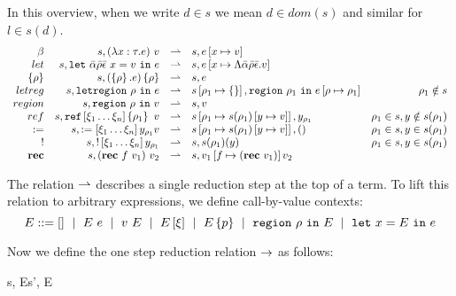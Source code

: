 \documentclass[a4paper]{article}
\newcommand{\rec}{{\bf rec}}
\newcommand{\void}{{\tt ()}}
\begin{document}
In this overview, when we write $d\in s$ we mean $d\in dom(s)$ and
similar for $l\in s(d)$.
\begin{equation*}
   \begin{array}[t]{rrclr}
    \beta & s, (\lambda x:\tau.e)\ v & \basered & s, \esub{e}{x\mapsto v} & \\
    let & s, \mllet{\bar{\alpha} \bar{\rho} \bar{\epsilon}\ x}{v}{e} & \basered & s,
    \esub{e}{x\mapsto \Lambda\bar{\alpha}\bar{\rho}\bar{\epsilon}.v} \\
    \capreg{\rho} & s, \rapp{(\regpr{\rho}{e})}{\rho} & \basered & s,e & \\
    letreg & s, \letreg{\rho}{e} & \basered & \statesub{s}{\rho_1\mapsto \left\{
    \right\}}, \region{\rho_1}{\regsub{e}{\rho\mapsto \rho_1}} & \rho_1\notin s \\
    region & s, \region{\rho}{v} & \basered & s, v \\
    ref & s, \reft \left[ \xi_1 \dots \xi_n \right] \capreg{\rho_1}\  v &
    \basered & s\left[ \rho_1 \mapsto s(\rho_1)\left[ y\mapsto v \right]\right],
    y_{\rho_1} & \rho_1\in s, y\notin s(\rho_1)\\
    := & s, := \left[ \xi_1 \dots \xi_n \right] y_{\rho_1} v & \basered & s\left[ \rho_1 \mapsto s(\rho_1)\left[
    y \mapsto v \right] \right], \void & \rho_1\in s, y\in s(\rho_1)\\
    ! & s, ! \left[ \xi_1 \dots \xi_n \right] y_{\rho_1} & \basered & s, s(\rho_1)(y) & \rho_1\in s, y\in
    s(\rho_1) \\
    \rec & s, (\rec\ f\ v_1)\ v_2 & \basered & s, v_1\left[ f \mapsto (\rec\
    v_1)  \right] v_2
  \end{array}
\end{equation*}

The relation $\rightharpoonup $ describes a single reduction step at the top of a
term. To lift this relation to arbitrary expressions, we define call-by-value
contexts:
\begin{equation*}
  E ::= \left[  \right] ~\mid~ E\ e ~\mid~ v\ E~\mid~ E \left[ \xi \right] ~\mid~
  E\left\{ p \right\} ~\mid~ \texttt{region}\ \rho\ \texttt{in}\ E ~\mid~ \texttt{let}\ x=E\ \texttt{in}\ e
\end{equation*}

Now we define the one step reduction relation $\rightarrow $ as follows:
\begin{mathpar}
    { s, E\left[ e \right] \onestep s', E\left[ e' \right] }
\end{mathpar}
\end{document}
